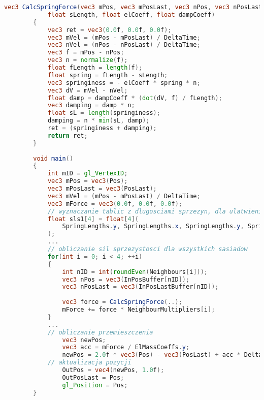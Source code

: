 		\begin{lstlisting}[language=GLSL]
		vec3 CalcSpringForce(vec3 mPos, vec3 mPosLast, vec3 nPos, vec3 nPosLast, 
			float sLength, float elCoeff, float dampCoeff)
		{
			vec3 ret = vec3(0.0f, 0.0f, 0.0f);
			vec3 mVel = (mPos - mPosLast) / DeltaTime;
			vec3 nVel = (nPos - nPosLast) / DeltaTime;
			vec3 f = mPos - nPos;
			vec3 n = normalize(f);
			float fLength = length(f);
			float spring = fLength - sLength;
			vec3 springiness = - elCoeff * spring * n;
			vec3 dV = mVel - nVel;
			float damp = dampCoeff * (dot(dV, f) / fLength);
			vec3 damping = damp * n;
			float sL = length(springiness);
			damping = n * min(sL, damp);
			ret = (springiness + damping);
			return ret;
		}
		
		void main()
		{
			int mID = gl_VertexID;
			vec3 mPos = vec3(Pos);
			vec3 mPosLast = vec3(PosLast);
			vec3 mVel = (mPos - mPosLast) / DeltaTime;
			vec3 mForce = vec3(0.0f, 0.0f, 0.0f);
			// wyznaczanie tablic z dlugosciami sprzezyn, dla ulatwienia dostepu z petli
			float sls1[4] = float[4](
				SpringLengths.y, SpringLengths.x, SpringLengths.y, SpringLengths.x
			);
			...
			// obliczanie sil sprzezystosci dla wszystkich sasiadow
			for(int i = 0; i < 4; ++i)
			{
				int nID = int(roundEven(Neighbours[i]));
				vec3 nPos = vec3(InPosBuffer[nID]);
				vec3 nPosLast = vec3(InPosLastBuffer[nID]);
				
				vec3 force = CalcSpringForce(..);
				mForce += force * NeighbourMultipliers[i];
			}
			...
			// obliczanie przemieszczenia
				vec3 newPos;
				vec3 acc = mForce / ElMassCoeffs.y;
				newPos = 2.0f * vec3(Pos) - vec3(PosLast) + acc * DeltaTime * DeltaTime;
			// aktualizacja pozycji
				OutPos = vec4(newPos, 1.0f);
				OutPosLast = Pos;
				gl_Position = Pos;
		}
		\end{lstlisting}
		
